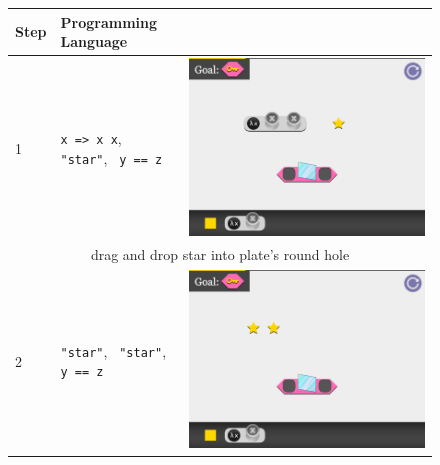 \begin{figure}
    \centering
    \begin{tabular}{|l|p{4.5cm}|l|}
    \hline
    Step & Programming Language & \NM{} \\\hline
    \hline
    1 & \verb|x => x x|, \verb| "star"|, \verb| y == z| & \includegraphics[scale=0.15]{images/reduct/lambda_xdot_x_x_-_y_eq_z_-_a_-_1.png} \\\hline
    \multicolumn{3}{c}{drag and drop star into plate's round hole} \\\hline
    2 & \verb|"star"|, \verb| "star"|, \verb| y == z|   & \includegraphics[scale=0.15]{images/reduct/lambda_xdot_x_x_-_y_eq_z_-_a_-_2.png} \\\hline

\end{tabular}
\end{figure}

